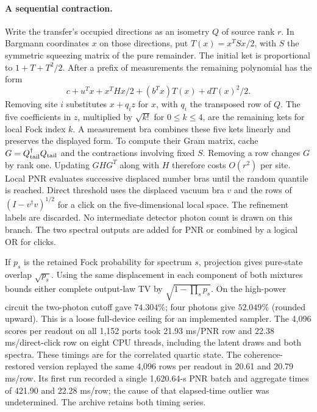 \documentclass[11pt]{article}
\begin{document}
\paragraph{A sequential contraction.}
Write the transfer's occupied directions as an isometry $Q$ of source rank $r$. In Bargmann coordinates $x$ on those directions, put $T(x)=x^TSx/2$, with $S$ the symmetric squeezing matrix of the pure remainder. The initial ket is proportional to $1+T+T^2/2$. After a prefix of measurements the remaining polynomial has the form
\[
 c+u^Tx+x^THx/2+(b^Tx)T(x)+d T(x)^2/2 .
\]
Removing site $i$ substitutes $x+q_i z$ for $x$, with $q_i$ the transposed row of $Q$. The five coefficients in $z$, multiplied by $\sqrt{k!}$ for $0\le k\le4$, are the remaining kets for local Fock index $k$. A measurement bra combines these five kets linearly and preserves the displayed form. To compute their Gram matrix, cache $G=Q_{\rm tail}^\dagger Q_{\rm tail}$ and the contractions involving fixed $S$. Removing a row changes $G$ by rank one. Updating $GHG^T$ along with $H$ therefore costs $O(r^2)$ per site. Local PNR evaluates successive displaced number bras until the random quantile is reached. Direct threshold uses the displaced vacuum bra $v$ and the rows of $(I-v^\dagger v)^{1/2}$ for a click on the five-dimensional local space. The refinement labels are discarded. No intermediate detector photon count is drawn on this branch. The two spectral outputs are added for PNR or combined by a logical OR for clicks.

If $p_s$ is the retained Fock probability for spectrum $s$, projection gives pure-state overlap $\sqrt{p_s}$. Using the same displacement in each component of both mixtures bounds either complete output-law TV by $\sqrt{1-\prod_s p_s}$. On the high-power circuit the two-photon cutoff gave $74.304\%$; four photons give $52.049\%$ (rounded upward). This is a loose full-device ceiling for an implemented sampler. The 4,096 scores per readout on all 1,152 ports took 21.93 ms/PNR row and 22.38 ms/direct-click row on eight CPU threads, including the latent draws and both spectra. These timings are for the correlated quartic state. The coherence-restored version replayed the same 4,096 rows per readout in 20.61 and 20.79 ms/row. Its first run recorded a single 1,620.64-s PNR batch and aggregate times of 421.90 and 22.28 ms/row; the cause of that elapsed-time outlier was undetermined. The archive retains both timing series.
\end{document}
